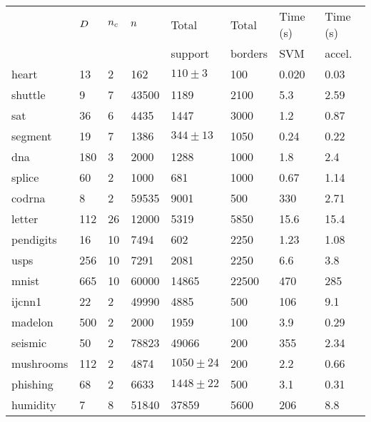 \begin{tabular}{|l|lllllll|}
	\hline
	& $D$ & $n_c$ & $n$ & Total & Total & Time (s) & Time (s)\\
	& & & & support & borders & SVM & accel. \\\hline
	heart & 13 & 2 & 162 & $110\pm3$ & 100 & 0.020 & 0.03\\
	shuttle & 9 & 7 & 43500 & 1189 & 2100 & 5.3 & 2.59\\
	sat & 36 & 6 & 4435 & 1447 & 3000 & 1.2 & 0.87 \\
	segment & 19 & 7 & 1386 & $344\pm13$ & 1050 & 0.24 & 0.22 \\
	dna & 180 & 3 & 2000 & 1288 & 1000 & 1.8 & 2.4 \\
	splice & 60 & 2 & 1000 & 681 & 1000 & 0.67 & 1.14 \\
	codrna & 8 & 2 & 59535 & 9001 & 500 & 330 & 2.71 \\
	letter & 112 & 26 & 12000 & 5319 & 5850 & 15.6 & 15.4 \\ 
	pendigits & 16 & 10 & 7494 & 602 & 2250 & 1.23 & 1.08 \\
	usps & 256 & 10 & 7291 & 2081 & 2250 & 6.6 & 3.8 \\
	mnist & 665 & 10 & 60000 & 14865 & 22500 & 470 & 285 \\
	ijcnn1 & 22 & 2 & 49990 & 4885 & 500 & 106 & 9.1 \\
	madelon & 500 & 2 & 2000 & 1959 & 100 & 3.9 & 0.29 \\
	seismic & 50 & 2 & 78823 & 49066 & 200 & 355 & 2.34 \\
	mushrooms & 112 & 2 & 4874 & $1050\pm24$ & 200 & 2.2 & 0.66 \\
	phishing & 68 & 2 & 6633 & $1448\pm22$ & 500 & 3.1 & 0.31 \\
	humidity & 7 & 8 & 51840 & 37859 & 5600 & 206 & 8.8 \\ 
	\hline
\end{tabular}

